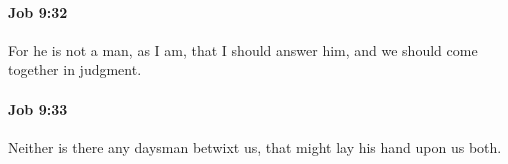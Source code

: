 		\paragraph{Job 9:32} %
			\label{JOB-9-32}

			For he is not a man, as I am, that I should answer him, and we should come together in judgment.


		\paragraph{Job 9:33} %
			\label{JOB-9-33}

			Neither is there any daysman betwixt us, that might lay his hand upon us both.


